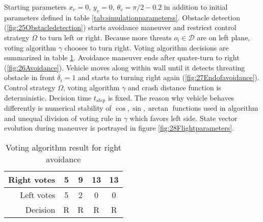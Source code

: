 Starting parameters $x_v = 0$, $y_v = 0$, $\theta_v = \pi/2 - 0.2 $ in addition to initial parameters defined in table \ref{tab:simulationparameterss}. Obstacle detection (\ref{fig:25Obstacledetection}) starts avoidance maneuver and restricst control strategy $\Omega$ to turn left or right. Because more threats $o_i\in\mathscr{D}$ are on left plane, voting algorithm $\gamma$ chooses to turn right. Voting algorithm decisions are summarized in table \ref{tab:avoidanceright}. Avoidance maneuver ends after quater-turn to right (\ref{fig:26Avoidance}). Vehicle moves along within wall until it detects threating obstacle in front $\delta_i=1$ and starts to turning right again (\ref{fig:27Endofavoidance}). Control strategy $\Omega$, voting algorithm $\gamma$ and crash distance function is deterministic. Decision time $t_{step}$ is fixed. The reason why vehicle behaves differently is numerical stability of $\cos,\sin,\arctan$ functions used in algorithm and unequal division of voting rule in $\gamma$ which favors left side. State vector evolution during maneuver is portrayed in figure \ref{fig:28Flightparameters}.

\begin{table}[H]
    \centering
    \begin{tabular}{|r||c|c|c|c|}
        \hline
        Right votes & 5 & 9 & 13 & 13\\
        \hline
        Left votes  & 5 & 2 & 0  & 0\\
        \hline\hline
        Decision    & R & R & R  & R\\
        \hline
    \end{tabular}
    \caption{Voting algorithm result for right avoidance}
    \label{tab:avoidanceright}
\end{table}


